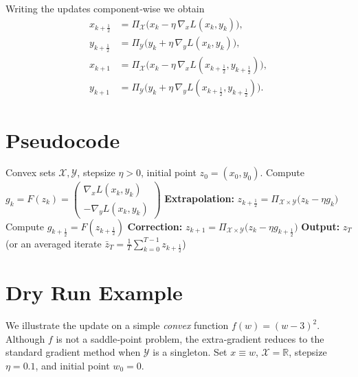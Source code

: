 \documentclass{article}
\begin{document}
Writing the updates component‑wise we obtain
\[
\begin{aligned}
x_{k+\frac12}&=\Pi_{\mathcal{X}}\!\bigl(x_{k}-\eta\,\nabla_{x}L(x_{k},y_{k})\bigr),\\
y_{k+\frac12}&=\Pi_{\mathcal{Y}}\!\bigl(y_{k}+\eta\,\nabla_{y}L(x_{k},y_{k})\bigr),\\[2mm]
x_{k+1}&=\Pi_{\mathcal{X}}\!\bigl(x_{k}-\eta\,\nabla_{x}L(x_{k+\frac12},y_{k+\frac12})\bigr),\\
y_{k+1}&=\Pi_{\mathcal{Y}}\!\bigl(y_{k}+\eta\,\nabla_{y}L(x_{k+\frac12},y_{k+\frac12})\bigr).
\end{aligned}
\]

\section{Pseudocode}
\begin{algorithm}[H]
\caption{Deterministic Extra‑Gradient for $\min_{x}\max_{y}L(x,y)$}
\begin{algorithmic}[1]
\Require Convex sets $\mathcal{X},\mathcal{Y}$, stepsize $\eta>0$, initial point $z_{0}=(x_{0},y_{0})$.
    \State Compute $g_{k}=F(z_{k})=
    \begin{pmatrix}
        \nabla_{x}L(x_{k},y_{k})\\
        -\nabla_{y}L(x_{k},y_{k})
    \end{pmatrix}$
    \State \textbf{Extrapolation:} $z_{k+\frac12}= \Pi_{\mathcal{X}\times\mathcal{Y}}\bigl(z_{k}-\eta g_{k}\bigr)$
    \State Compute $g_{k+\frac12}=F(z_{k+\frac12})$
    \State \textbf{Correction:} $z_{k+1}= \Pi_{\mathcal{X}\times\mathcal{Y}}\bigl(z_{k}-\eta g_{k+\frac12}\bigr)$
\EndFor
\State \textbf{Output:} $z_{T}$ (or an averaged iterate $\bar z_T=\frac1T\sum_{k=0}^{T-1}z_{k+\frac12}$)
\end{algorithmic}
\end{algorithm}

\section{Dry Run Example}
We illustrate the update on a simple \emph{convex} function $f(w)=(w-3)^{2}$.
Although $f$ is not a saddle‑point problem, the extra‑gradient reduces to the standard gradient method when $\mathcal{Y}$ is a singleton.  
Set $x\equiv w$, $\mathcal{X}=\mathbb{R}$, stepsize $\eta=0.1$, and initial point $w_{0}=0$.
\end{document}
